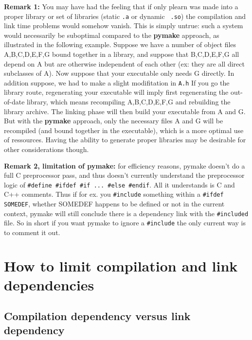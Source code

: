 \documentclass[11pt]{book}
\begin{document}
{\bf Remark 1:} You may have had the feeling that if only plearn was made
into a proper library or set of libraries (static {\tt .a} or dynamic {\tt
.so}) the compilation and link time problems would somehow vanish. This is
simply untrue: such a system would necessarily be suboptimal compared to
the {\bf pymake} approach, as illustrated in the following example. Suppose
we have a number of object files A,B,C,D,E,F,G bound together in a library,
and suppose that B,C,D,E,F,G all depend on A but are otherwise independent of each other (ex: they are all direct
subclasses of A). Now suppose that your executable only needs G
directly. In addition suppose, we had to make a slight modifitation in
{\tt A.h} If you go the library route, regenerating your executable will imply
first regenerating the out-of-date library, which means recompiling
A,B,C,D,E,F,G and rebuilding the library archive. The linking phase will
then build your executable from A and G. But with the {\bf pymake}
approach, only the necessary files A and G will be recompiled (and bound
together in the executable), which is a more optimal use of ressources.
Having the ability to generate proper libraries may be desirable for other considerations though.

{\bf Remark 2, limitation of pymake:} for efficiency reasons, pymake doesn't do a
full C preprocessor pass, and thus doesn't currently understand the
preprocessor logic of {\tt \#define \#ifdef \#if ... \#else \#endif}. All it
understands is C and C++ comments. Thus if for ex. you {\tt \#include} something
within a {\tt \#ifdef SOMEDEF}, whether SOMEDEF happens to be defined or not in
the current context, pymake will still conclude there is a dependency link
with the {\tt \#included} file. So in short if you want pymake to ignore a
{\tt \#include} the only current way is to comment it out. 


\section{How to limit compilation and link dependencies}

\subsection{Compilation dependency versus link dependency}
\end{document}

